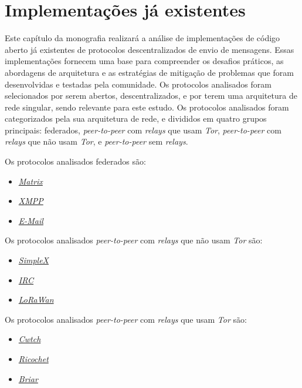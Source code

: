 
\chapter{Implementações já existentes}

Este capítulo da monografia realizará a análise de implementações de código aberto já existentes de protocolos descentralizados de envio de mensagens. Essas implementações fornecem uma base para compreender os desafios práticos, as abordagens de arquitetura e as estratégias de mitigação de problemas que foram desenvolvidas e testadas pela comunidade. Os protocolos analisados foram selecionados por serem abertos, descentralizados, e por terem uma arquitetura de rede singular, sendo relevante para este estudo. Os protocolos analisados foram categorizados pela sua arquitetura de rede, e divididos em quatro grupos principais: federados, \textit{peer-to-peer} com \textit{relays} que usam \textit{Tor}, \textit{peer-to-peer} com \textit{relays} que não usam \textit{Tor}, e \textit{peer-to-peer} sem \textit{relays}.

Os protocolos analisados federados são:
\begin{itemize}
  \item \href{https://matrix.org/}{\textit{Matrix}}
  \item \href{https://xmpp.org/}{\textit{XMPP}}
  \item \href{https://datatracker.ietf.org/doc/html/rfc5321}{\textit{E-Mail}}
\end{itemize}

Os protocolos analisados \textit{peer-to-peer} com \textit{relays} que não usam \textit{Tor} são:
\begin{itemize}
  \item \href{https://simplex.chat/}{\textit{SimpleX}}
  \item \href{https://datatracker.ietf.org/doc/html/rfc2810}{\textit{IRC}}
  \item \href{https://lora-alliance.org/}{\textit{LoRaWan}}
\end{itemize}

Os protocolos analisados \textit{peer-to-peer} com \textit{relays} que usam \textit{Tor} são:
\begin{itemize}
  \item \href{https://cwtch.im/}{\textit{Cwtch}}
  \item \href{https://ricochet.im/}{\textit{Ricochet}}
  \item \href{https://briarproject.org/}{\textit{Briar}}
\end{itemize}

